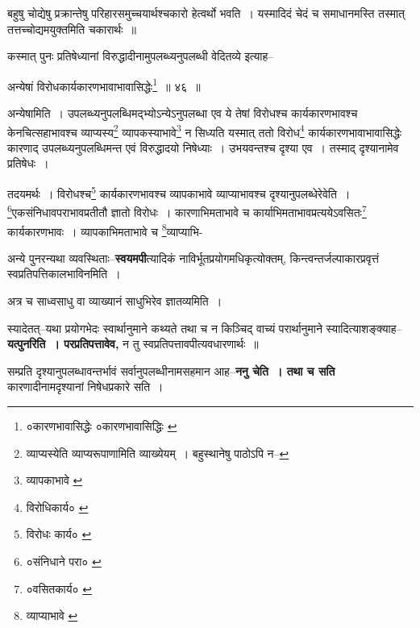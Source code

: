 \documentclass[article,12pt,a4paper]{memoir}
\begin{document}
	  \pstart बहुषु चोद्येषु प्रक्रान्तेषु परिहारसमुच्चयार्थश्चकारो हेत्वर्थो भवति । यस्मादिदं चेदं च समाधानमस्ति तस्मात् तत्तच्चोद्यमयुक्तमिति चकारार्थः ॥
	\pend
       

	  \pstart कस्मात् पुनः प्रतिषेध्यानां विरुद्धादीनामुपलब्ध्यनुपलब्धी वेदितव्ये इत्याह--
	\pend
       
	  \bigskip
	  \begingroup
	

	  \pstart अन्येषां विरोधकार्यकारणभावाभावासिद्धेः\footnote{०कारणभावासिद्धेः \cite{dp-edE} ०कारणभावासिद्धिः \cite{dp-msB} \cite{dp-edP} \cite{dp-edH}} ॥ ४६ ॥
	\pend
      
	  \endgroup
	 

	  \pstart अन्येषामिति । उपलब्ध्यनुपलब्धिमद्भ्योऽन्येऽनुपलब्धा एव ये तेषां विरोधश्च कार्यकारणभावश्च केनचित्सहाभावश्च व्याप्यस्य\footnote{व्याप्यस्येति व्याप्यरूपाणामिति व्याख्येयम् । बहुस्थानेषु पाठोऽपि न--\cite{dp-msD-n}} व्यापकस्याभावे\footnote{व्यापकाभावे \cite{dp-msC}} न सिध्यति यस्मात् ततो विरोध\footnote{विरोधिकार्य० \cite{dp-msA} \cite{dp-msB} \cite{dp-edP} \cite{dp-edE} \cite{dp-edH} \cite{dp-edN}} कार्यकारणभावाभावासिद्धेः कारणाद् उपलब्ध्यनुपलब्धिमन्त एवं विरुद्धादयो निषेध्याः । उभयवन्तश्च दृश्या एव । तस्माद् दृश्यानामेव प्रतिषेधः ।
	\pend
       

	  \pstart तदयमर्थः । विरोधश्च\footnote{विरोधः कार्य० \cite{dp-msA} \cite{dp-edP} \cite{dp-edH} \cite{dp-edE}} कार्यकारणभावश्च व्यापकाभावे व्याप्याभावश्च दृश्यानुपलब्धेरेवेति । \footnote{०संनिधाने परा० \cite{dp-msC}}एकसंनिधावपराभावप्रतीतौ ज्ञातो विरोधः । कारणाभिमताभावे च कार्याभिमताभावप्रत्ययेऽवसितः\footnote{०वसितकार्य० \cite{dp-edP} \cite{dp-edH} \cite{dp-msA} \cite{dp-msB}} कार्यकारणभावः । व्यापकाभिमताभावे च \footnote{व्याप्याभावे \cite{dp-msA} \cite{dp-msB} \cite{dp-msD} \cite{dp-edP} \cite{dp-edH} \cite{dp-edE} \cite{dp-edN}}व्याप्याभि-
	\pend
      
	  \endgroup
	

	  \pstart अन्ये पुनरन्यथा व्यवस्थिताः--\textbf{स्वयमपी}त्यादिकं नाविर्भूतप्रयोगमधिकृत्योक्तम्, किन्त्वन्तर्जल्पाकारप्रवृत्तं स्वप्रतिपत्तिकालभा\leavevmode{}विनमिति ।
	\pend
      

	  \pstart अत्र च साध्वसाधु वा व्याख्यानं साधुभिरेव ज्ञातव्यमिति ।
	\pend
      

	  \pstart स्यादेतत्--यथा प्रयोगभेदः स्वार्थानुमाने कथ्यते तथा च न किञ्चिद् वाच्यं परार्थानुमाने स्यादित्याशङ्क्याह--\textbf{यत्पुनरिति । परप्रतिपत्तावेव,} न तु स्वप्रतिपत्तावपीत्यवधारणार्थः ॥
	\pend
      

	  \pstart सम्प्रति दृश्यानुपलब्धावन्तर्भावं सर्वानुपलब्धीनामसहमान आह--\textbf{ननु चेति । तथा च सति} कारणादीनामदृश्यानां निषेधप्रकारे सति ।
	\pend
      
\end{document}
